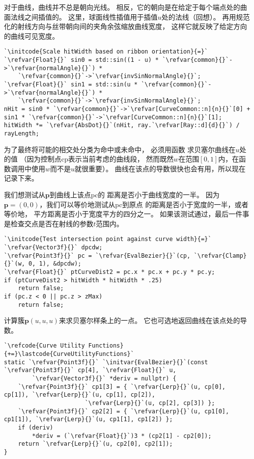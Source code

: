 对于曲线，曲线并不总是朝向光线。
相反，它的朝向是在给定于每个端点处的曲面法线之间插值的。
这里，球面线性插值用于插值$u$处的法线（回想）。
再用规范化的射线方向与丝带朝向间的夹角余弦缩放曲线宽度，
这样它就反映了给定方向的曲线可见宽度。
\begin{lstlisting}
`\initcode{Scale hitWidth based on ribbon orientation}{=}`
`\refvar{Float}{}` sin0 = std::sin((1 - u) * `\refvar{common}{}`->`\refvar{normalAngle}{}`) *
    `\refvar{common}{}`->`\refvar{invSinNormalAngle}{}`;
`\refvar{Float}{}` sin1 = std::sin(u * `\refvar{common}{}`->`\refvar{normalAngle}{}`) *
    `\refvar{common}{}`->`\refvar{invSinNormalAngle}{}`;
nHit = sin0 * `\refvar{common}{}`->`\refvar[CurveCommon::n]{n}{}`[0] + sin1 * `\refvar{common}{}`->`\refvar[CurveCommon::n]{n}{}`[1];
hitWidth *= `\refvar{AbsDot}{}`(nHit, ray.`\refvar[Ray::d]{d}{}`) / rayLength;
\end{lstlisting}

为了最终将可能的相交处分类为命中或未命中，
必须用函数
求贝塞尔曲线在$u$处的值
（因为控制点{\ttfamily cp}表示当前考虑的曲线段，
然而既然$w$在范围$[0,1]$内，在函数调用中使用$w$而不是$u$就很重要）。
曲线在该点的导数很快也会有用，所以现在记录下来。

我们想测试从$\bm p$到曲线上该点{\ttfamily pc}的
距离是否小于曲线宽度的一半。
因为$\bm p=(0,0)$，我们可以等价地测试从{\ttfamily pc}到原点
的距离是否小于宽度的一半，或者等价地，
平方距离是否小于宽度平方的四分之一。
如果该测试通过，最后一件事是检查交点是否在射线的参数$t$范围内。
\begin{lstlisting}
`\initcode{Test intersection point against curve width}{=}`
`\refvar{Vector3f}{}` dpcdw;
`\refvar{Point3f}{}` pc = `\refvar{EvalBezier}{}`(cp, `\refvar{Clamp}{}`(w, 0, 1), &dpcdw);
`\refvar{Float}{}` ptCurveDist2 = pc.x * pc.x + pc.y * pc.y;
if (ptCurveDist2 > hitWidth * hitWidth * .25)
    return false;
if (pc.z < 0 || pc.z > zMax)
    return false;
\end{lstlisting}

计算簇$\bm p(u,u,u)$来求贝塞尔样条上的一点。
它也可选地返回曲线在该点处的导数。
\begin{lstlisting}
`\refcode{Curve Utility Functions}{+=}\lastcode{CurveUtilityFunctions}`
static `\refvar{Point3f}{}` `\initvar{EvalBezier}{}`(const `\refvar{Point3f}{}` cp[4], `\refvar{Float}{}` u,
        `\refvar{Vector3f}{}` *deriv = nullptr) {
    `\refvar{Point3f}{}` cp1[3] = { `\refvar{Lerp}{}`(u, cp[0], cp[1]), `\refvar{Lerp}{}`(u, cp[1], cp[2]),
                       `\refvar{Lerp}{}`(u, cp[2], cp[3]) };
    `\refvar{Point3f}{}` cp2[2] = { `\refvar{Lerp}{}`(u, cp1[0], cp1[1]), `\refvar{Lerp}{}`(u, cp1[1], cp1[2]) };
    if (deriv)
        *deriv = (`\refvar{Float}{}`)3 * (cp2[1] - cp2[0]);
    return `\refvar{Lerp}{}`(u, cp2[0], cp2[1]);
}
\end{lstlisting}

